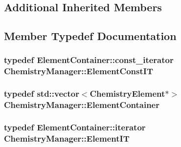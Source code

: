 \subsection*{Additional Inherited Members}


\subsection{Member Typedef Documentation}
\subsubsection[{\texorpdfstring{Element\+Const\+IT}{ElementConstIT}}]{\setlength{\rightskip}{0pt plus 5cm}typedef Element\+Container\+::const\+\_\+iterator {\bf Chemistry\+Manager\+::\+Element\+Const\+IT}}\hypertarget{classChemistryManager_a9ce1f32f52966ba360c8c9d443147908}{}\label{classChemistryManager_a9ce1f32f52966ba360c8c9d443147908}
\subsubsection[{\texorpdfstring{Element\+Container}{ElementContainer}}]{\setlength{\rightskip}{0pt plus 5cm}typedef std\+::vector$<${\bf Chemistry\+Element}$\ast$$>$ {\bf Chemistry\+Manager\+::\+Element\+Container}}\hypertarget{classChemistryManager_a497405ec5c9312ef9a37298ff3b2506c}{}\label{classChemistryManager_a497405ec5c9312ef9a37298ff3b2506c}
\subsubsection[{\texorpdfstring{Element\+IT}{ElementIT}}]{\setlength{\rightskip}{0pt plus 5cm}typedef Element\+Container\+::iterator {\bf Chemistry\+Manager\+::\+Element\+IT}}\hypertarget{classChemistryManager_adc7451eba7244ac677ffc00f9b6bd6b0}{}\label{classChemistryManager_adc7451eba7244ac677ffc00f9b6bd6b0}
